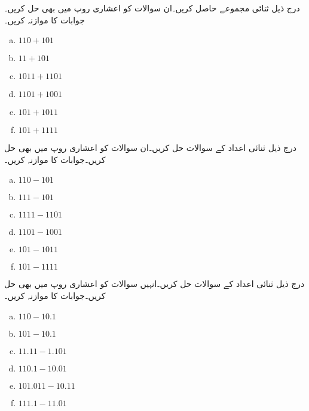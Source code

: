 درج ذیل ثنائی مجموعے حاصل کریں۔ان سوالات کو اعشاری روپ میں بھی حل کریں۔جوابات کا موازنہ کریں۔
\begin{multicols}{4}
\begin{enumerate}[a.]

\item  
 \(110+101\)  
\item 
 \(11+101\) 

\item  
 \(1011+1101\)  
\item 
 \(1101+1001\)   

\item  
 \(101+1011\)  
\item 
 \(101+1111\)  
\end{enumerate}
\end{multicols}
درج ذیل ثنائی اعداد کے سوالات حل کریں۔ان سوالات کو اعشاری روپ میں بھی حل کریں۔جوابات کا موازنہ کریں۔
\begin{multicols}{4}
\begin{enumerate}[a.]

\item  
 \(110-101\)  
\item 
 \(111-101\) 

\item  
 \(1111-1101\)  
\item 
 \(1101-1001\)   

\item  
 \(101-1011\)  
\item 
 \(101-1111\)
\end{enumerate}
\end{multicols}
درج ذیل ثنائی اعداد کے سوالات حل کریں۔انہیں سوالات کو اعشاری روپ میں بھی حل کریں۔جوابات کا موازنہ کریں۔
\begin{multicols}{4}
\begin{enumerate}[a.]
\item  
 \(110-10.1\)  
\item 
 \(101-10.1\) 

\item  
 \(11.11-1.101\)  
\item 
 \(110.1-10.01\)   

\item  
 \(101.011-10.11\) 
\item 
 \(111.1-11.01\)
\end{enumerate}
\end{multicols}
